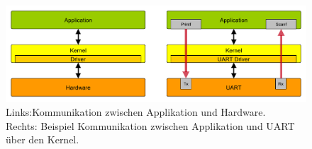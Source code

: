 \begin{figure}[h]
\begin{center}
\includegraphics[width=\textwidth]{img/general/Kernel_Hardware_Layer.pdf}
\caption{Links:Kommunikation zwischen Applikation und Hardware.\\Rechts: Beispiel Kommunikation zwischen Applikation und UART über den Kernel.}
\label{figure_KernelHardwareLayer}
\end{center}
\end{figure}